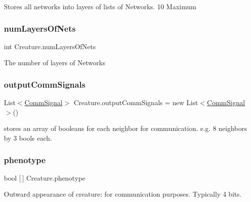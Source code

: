 Stores all networks into layers of lists of Networks. 10 Maximum 

\mbox{\label{class_creature_a58383de337fb218495e70aa126981d6c}} 
\subsubsection{\texorpdfstring{num\+Layers\+Of\+Nets}{numLayersOfNets}}
{\footnotesize\ttfamily int Creature.\+num\+Layers\+Of\+Nets}



The number of layers of Networks 

\mbox{\label{class_creature_a1a6c6390564dda480623b55d89c6d5b3}} 
\subsubsection{\texorpdfstring{output\+Comm\+Signals}{outputCommSignals}}
{\footnotesize\ttfamily List$<$\mbox{\hyperlink{class_comm_signal}{Comm\+Signal}}$>$ Creature.\+output\+Comm\+Signals = new List$<$\mbox{\hyperlink{class_comm_signal}{Comm\+Signal}}$>$()}



stores an array of booleans for each neighbor for communication. e.\+g. 8 neighbors by 3 bools each. 

\mbox{\label{class_creature_ae0d804e7589fe2c612dafe930d74fe46}} 
\subsubsection{\texorpdfstring{phenotype}{phenotype}}
{\footnotesize\ttfamily bool \mbox{[}$\,$\mbox{]} Creature.\+phenotype}



Outward appearance of creature\+: for communication purposes. Typically 4 bits. 

\mbox{\label{class_creature_ab6036649791244250e257da28733b2e7}} 

